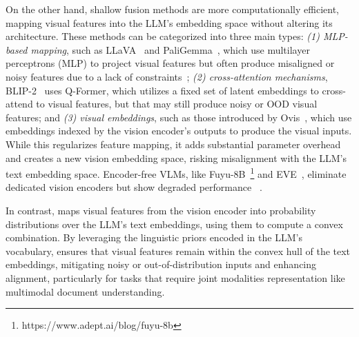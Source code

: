 On the other hand, shallow fusion methods are more computationally efficient, mapping visual features into the LLM's embedding space without altering its architecture. These methods can be categorized into three main types: \emph{(1) MLP-based mapping}, such as LLaVA~\citep{liu2023llava} and PaliGemma~\citep{beyer2024paligemmaversatile3bvlm}, which use multilayer perceptrons (MLP) to project visual features but often produce misaligned or noisy features due to a lack of constraints~\citep{rodriguez2024starvector}; \emph{(2) cross-attention mechanisms}, BLIP-2~\citep{blip2} uses Q-Former, which utilizes a fixed set of latent embeddings to cross-attend to visual features, but that may still produce noisy or OOD visual features; and \emph{(3) visual embeddings}, such as those introduced by Ovis~\citep{ovis}, which use embeddings indexed by the vision encoder's outputs to produce the visual inputs. While this regularizes feature mapping, it adds substantial parameter overhead and creates a new vision embedding space, risking misalignment with the LLM's text embedding space. Encoder-free VLMs, like Fuyu-8B~\footnote{https://www.adept.ai/blog/fuyu-8b} and EVE~\citep{eve:diao2024unveiling}, eliminate dedicated vision encoders but show degraded performance ~\citep{beyer2024paligemmaversatile3bvlm}.

In contrast, \ourmodel{} maps visual features from the vision encoder into probability distributions over the LLM's text embeddings, using them to compute a convex combination. By leveraging the linguistic priors encoded in the LLM's vocabulary, \ourmodel{} ensures that visual features remain within the convex hull of the text embeddings, mitigating noisy or out-of-distribution inputs and enhancing alignment, particularly for tasks that require joint modalities representation like multimodal document understanding.



  


















